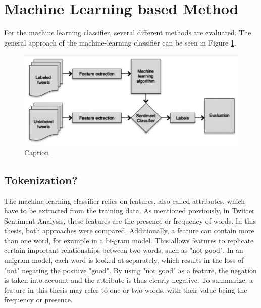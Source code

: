 \section{Machine Learning based Method}
For the machine learning classifier, several different methods are evaluated. The general approach of the machine-learning classifier can be seen in Figure \ref{fig:ml_approach}.
\begin{figure}
    \centering
    \includegraphics[scale=0.5]{Images/ML_approach.png}
    \caption{Caption}
    \label{fig:ml_approach}
\end{figure}


\subsection{Tokenization?}
The machine-learning classifier relies on features, also called attributes, which have to be extracted from the training data. As mentioned previously, in Twitter Sentiment Analysis, these features are the presence or frequency of words. In this thesis, both approaches were compared. Additionally, a feature can contain more than one word, for example in a bi-gram model. This allows features to replicate certain important relationships between two words, such as "not good". In an unigram model, each word is looked at separately, which results
in the loss of "not" negating the positive "good". By using "not good" as a feature, the negation is taken into account and the attribute is thus clearly negative. To summarize, a feature in this thesis may refer to one or two words, with their value being the frequency or presence.

